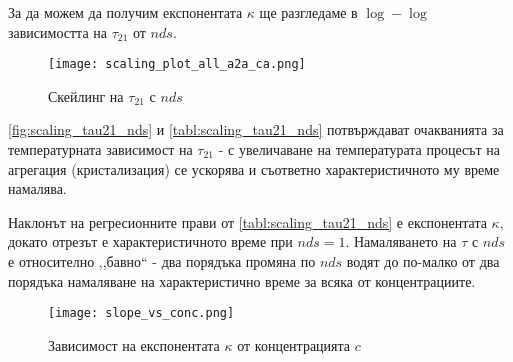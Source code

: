 За да можем да получим експонентата $\kappa$ ще разгледаме в $\log-\log$ зависимостта на $\tau_{21}$ от $nds$.
\begin{figure}[hbpt]
    \centering
    \texttt{[image: scaling\_plot\_all\_a2a\_ca.png]}
    \caption{Скейлинг на $\tau_{21}$ с $nds$}
    \label{fig:scaling_tau21_nds}
\end{figure}
\begin{table}[hbpt]
\centering
\caption{Резултати от линейната регресия за всяка от концентрациите на автомата.}
\label{tabl:scaling_tau21_nds}
\end{table}

\autoref{fig:scaling_tau21_nds} и \autoref{tabl:scaling_tau21_nds} потвърждават очакванията за температурната зависимост на $\tau_{21}$ - с увеличаване на температурата процесът на агрегация (кристализация) се ускорява и съответно характеристичното му време намалява.

Наклонът на регресионните прави от \autoref{tabl:scaling_tau21_nds} е експонентата $\kappa$, докато отрезът е характеристичното време при $nds = 1$. Намаляването на $\tau$ с $nds$ е относително ,,бавно`` - два порядъка промяна по $nds$ водят до по-малко от два порядъка намаляване на характеристично време за всяка от концентрациите.

\begin{figure}[H]
    \centering
    \texttt{[image: slope\_vs\_conc.png]}
    \caption{Зависимост на експонентата $\kappa$ от концентрацията $c$}
    \label{fig:scaling_kappa_vs_conc_ca}
\end{figure}

